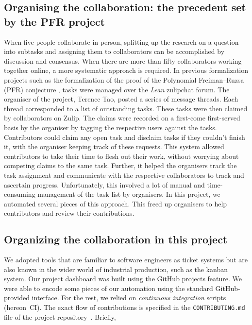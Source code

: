 \subsection{Organising the collaboration: the precedent set by the PFR project}
When five people collaborate in person, splitting up the research on a question into subtasks and assigning them to collaborators can be accomplished by discussion and consensus. When there are more than fifty collaborators working together online, a more systematic approach is required. In previous formalization projects such as the formalization of the proof of the Polynomial Freiman--Ruzsa (PFR) conjecture \cite{PFR_Tao_Dilles_2023}, tasks were managed over the \emph{Lean} zulipchat forum. The organiser of the project, Terence Tao, posted a series of message threads. Each thread corresponded to a list of outstanding tasks. These tasks were then claimed by collaborators on Zulip. The claims were recorded on a first-come first-served basis by the organiser by tagging the respective users against the tasks. Contributors could claim any open task and disclaim tasks if they couldn't finish it, with the organiser keeping track of these requests. This system allowed contributors to take their time to flesh out their work, without worrying about competing claims to the same task. Further, it helped the organisers track the task assignment and communicate with the respective collaborators to track and ascertain progress. Unfortunately, this involved a lot of manual and time-consuming management of the task list by organisers. In this project, we automated several pieces of this approach. This freed up organisers to help contributors and review their contributions.

\subsection{Organizing the collaboration in this project}
We adopted tools that are familiar to software engineers as ticket systems but are also known in the wider world of industrial production, such as the kanban system. Our project dashboard was built using the GitHub projects feature. We were able to encode some pieces of our automation using the standard GitHub-provided interface. For the rest, we relied on \emph{continuous integration} scripts (hereon~CI\@). The exact flow of contributions is specified in the \texttt{CONTRIBUTING.md} file of the project repository~\cite{The_Equational_Theories_repository}. Briefly,

